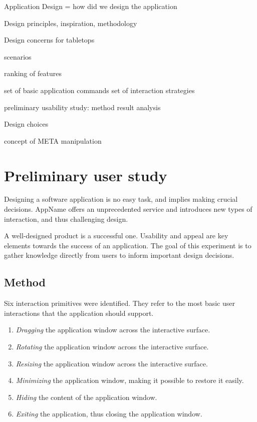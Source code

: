 

Application Design
= how did we design the application

Design principles, inspiration, methodology

Design concerns for tabletops

scenarios

ranking of features

set of basic application commands
set of interaction strategies

preliminary usability study:
method
result analysis

Design choices

concept of META manipulation

\chapter{Preliminary user study}

Designing a software application is no easy task, and implies making crucial decisions.
AppName offers an unprecedented service and introduces new types of interaction, and thus challenging design.

A well-designed product is a successful one.
Usability and appeal are key elements towards the success of an application.
The goal of this experiment is to gather knowledge directly from users to inform important design decisions.

\section{Method}

Six interaction primitives were identified.
They refer to the most basic user interactions that the application should support.
\begin{enumerate}
\item{\emph{Dragging} the application window across the interactive surface.}
\item{\emph{Rotating} the application window across the interactive surface.}
\item{\emph{Resizing} the application window across the interactive surface.}
\item{\emph{Minimizing} the application window, making it possible to restore it easily.}
\item{\emph{Hiding} the content of the application window.}
\item{\emph{Exiting} the application, thus closing the application window.}
\end{enumerate}


